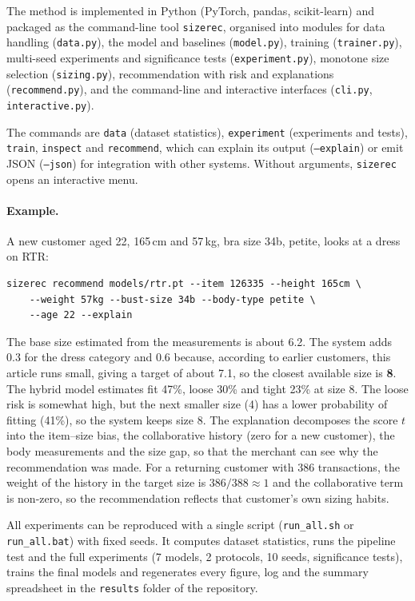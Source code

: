 The method is implemented in Python (PyTorch, pandas, scikit-learn) and packaged as the command-line tool \texttt{sizerec}, organised into modules for data handling (\texttt{data.py}), the model and baselines (\texttt{model.py}), training (\texttt{trainer.py}), multi-seed experiments and significance tests (\texttt{experiment.py}), monotone size selection (\texttt{sizing.py}), recommendation with risk and explanations (\texttt{recommend.py}), and the command-line and interactive interfaces (\texttt{cli.py}, \texttt{interactive.py}).

The commands are \texttt{data} (dataset statistics), \texttt{experiment} (experiments and tests), \texttt{train}, \texttt{inspect} and \texttt{recommend}, which can explain its output (\texttt{--explain}) or emit JSON (\texttt{--json}) for integration with other systems. Without arguments, \texttt{sizerec} opens an interactive menu.

\paragraph{Example.} A new customer aged 22, 165\,cm and 57\,kg, bra size 34b, petite, looks at a dress on RTR:
\begin{verbatim}
sizerec recommend models/rtr.pt --item 126335 --height 165cm \
    --weight 57kg --bust-size 34b --body-type petite \
    --age 22 --explain
\end{verbatim}
The base size estimated from the measurements is about 6.2. The system adds 0.3 for the dress category and 0.6 because, according to earlier customers, this article runs small, giving a target of about 7.1, so the closest available size is \textbf{8}. The hybrid model estimates fit 47\%, loose 30\% and tight 23\% at size 8. The loose risk is somewhat high, but the next smaller size (4) has a lower probability of fitting (41\%), so the system keeps size 8. The explanation decomposes the score $t$ into the item--size bias, the collaborative history (zero for a new customer), the body measurements and the size gap, so that the merchant can see why the recommendation was made. For a returning customer with 386 transactions, the weight of the history in the target size is $386/388 \approx 1$ and the collaborative term is non-zero, so the recommendation reflects that customer's own sizing habits.

All experiments can be reproduced with a single script (\texttt{run\_all.sh} or \texttt{run\_all.bat}) with fixed seeds. It computes dataset statistics, runs the pipeline test and the full experiments (7 models, 2 protocols, 10 seeds, significance tests), trains the final models and regenerates every figure, log and the summary spreadsheet in the \texttt{results} folder of the repository.

